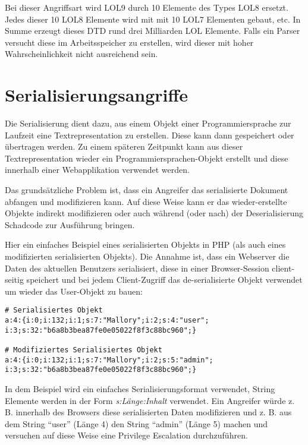 Bei dieser Angriffsart wird LOL9 durch 10 Elemente des Types LOL8 ersetzt. Jedes dieser 10 LOL8 Elemente wird mit mit 10 LOL7 Elementen gebaut, etc. In Summe erzeugt dieses DTD rund drei Milliarden LOL Elemente. Falls ein Parser versucht diese im Arbeitsspeicher zu erstellen, wird dieser mit hoher Wahrscheinlichkeit nicht ausreichend sein.

\section{Serialisierungsangriffe}

Die Serialisierung dient dazu, aus einem Objekt einer Programmiersprache zur Laufzeit eine Textrepresentation zu erstellen. Diese kann dann gespeichert oder übertragen werden. Zu einem späteren Zeitpunkt kann aus dieser Textrepresentation wieder ein Programmiersprachen-Objekt erstellt und diese innerhalb einer Webapplikation verwendet werden.

Das grundsätzliche Problem ist, dass ein Angreifer das serialisierte Dokument abfangen und modifizieren kann. Auf diese Weise kann er das wieder-erstellte Objekte indirekt modifizieren oder auch während (oder nach) der Deserialisierung Schadcode zur Ausführung bringen.

Hier ein einfaches Beispiel eines serialisierten Objekts in PHP (als auch eines modifizierten serialisierten Objekts). Die Annahme ist, dass ein Webserver die Daten des aktuellen Benutzers serialisiert, diese in einer Browser-Session client-seitig speichert und bei jedem Client-Zugriff das de-serialisierte Objekt verwendet um wieder das User-Objekt zu bauen:

\begin{verbatim}
# Serialisiertes Objekt
a:4:{i:0;i:132;i:1;s:7:"Mallory";i:2;s:4:"user"; i:3;s:32:"b6a8b3bea87fe0e05022f8f3c88bc960";}

# Modifiziertes Serialisiertes Objekt
a:4:{i:0;i:132;i:1;s:7:"Mallory";i:2;s:5:"admin"; i:3;s:32:"b6a8b3bea87fe0e05022f8f3c88bc960";}
\end{verbatim}

In dem Beispiel wird ein einfaches Serialisierungsformat verwendet, String Elemente werden in der Form \textit{s:Länge:Inhalt} verwendet. Ein Angreifer würde z. B. innerhalb des Browsers diese serialisierten Daten modifizieren und z. B. aus dem String ``user'' (Länge 4) den String ``admin'' (Länge 5) machen und versuchen auf diese Weise eine Privilege Escalation durchzuführen.

